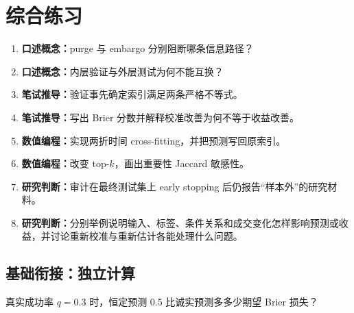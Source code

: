 \section{综合练习}
\begin{enumerate}[leftmargin=*]
  \item \textbf{口述概念：}purge 与 embargo 分别阻断哪条信息路径？
  \item \textbf{口述概念：}内层验证与外层测试为何不能互换？
  \item \textbf{笔试推导：}验证事先确定索引满足两条严格不等式。
  \item \textbf{笔试推导：}写出 Brier 分数并解释校准改善为何不等于收益改善。
  \item \textbf{数值编程：}实现两折时间 cross-fitting，并把预测写回原索引。
  \item \textbf{数值编程：}改变 top-$k$，画出重要性 Jaccard 敏感性。
  \item \textbf{研究判断：}审计在最终测试集上 early stopping 后仍报告“样本外”的研究材料。
  \item \textbf{研究判断：}分别举例说明输入、标签、条件关系和成交变化怎样影响预测或收益，并讨论重新校准与重新估计各能处理什么问题。
\end{enumerate}

\subsection*{基础衔接：独立计算}
真实成功率 $q=0.3$ 时，恒定预测 0.5 比诚实预测多多少期望 Brier 损失？
